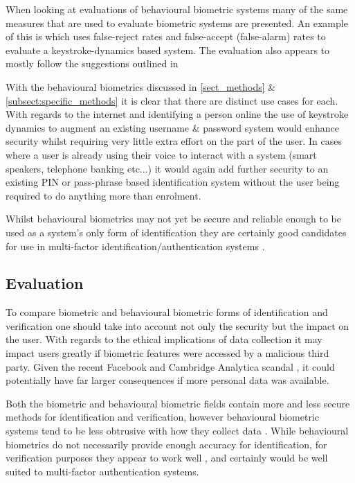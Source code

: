 \documentclass[12pt]{article}
\begin{document}
	When looking at evaluations of behavioural biometric systems many of the same measures that are used to evaluate biometric systems are presented. An example of this is \cite{typing_auth2005} which uses false-reject rates and false-accept (false-alarm) rates to evaluate a keystroke-dynamics based system. The evaluation also appears to mostly follow the suggestions outlined in \cite{phillips_evaluating_biometric_systems2000} 
	
	With the behavioural biometrics discussed in \ref{sect_methods} \& \ref{subsect:specific_methods} it is clear that there are distinct use cases for each. With regards to the internet and identifying a person online the use of keystroke dynamics to augment an existing username \& password system would enhance security whilst requiring very little extra effort on the part of the user. In cases where a user is already using their voice to interact with a system (smart speakers, telephone banking etc...) it would again add further security to an existing PIN or pass-phrase based identification system without the user being required to do anything more than enrolment.
	
	Whilst behavioural biometrics may not yet be secure and reliable enough to be used as a system's only form of identification they are certainly good candidates for use in multi-factor identification/authentication systems \citep{yampolskiy2008behavioural}.
	
	\subsection{Evaluation}
	\label{subsect:evaluation}
	To compare biometric and behavioural biometric forms of identification and verification one should take into account not only the security but the impact on the user. With regards to the ethical implications of data collection it may impact users greatly if biometric features were accessed by a malicious third party. Given the recent Facebook and Cambridge Analytica scandal \citep{graham-harrison_cadwalladr_2018}, it could potentially have far larger consequences if more personal data was available. 
	
	Both the biometric and behavioural biometric fields contain more and less secure methods for identification and verification, however behavioural biometric systems tend to be less obtrusive with how they collect data \citep{yampolskiy2008behavioural}. While behavioural biometrics do not necessarily provide enough accuracy for identification, for verification purposes they appear to work well \citep{yampolskiy2008behavioural}, and certainly would be well suited to multi-factor authentication systems.
	
\end{document}
